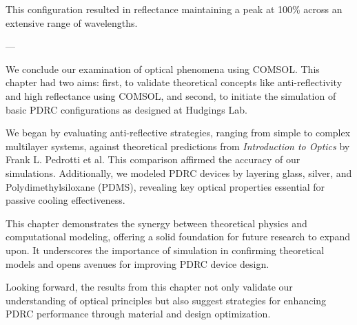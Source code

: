 This configuration resulted in reflectance maintaining a peak at 100\% across an extensive range of wavelengths.


---


We conclude our examination of optical phenomena using COMSOL. This chapter had two aims: first, to validate theoretical concepts like anti-reflectivity and high reflectance using COMSOL, and second, to initiate the simulation of basic PDRC configurations as designed at Hudgings Lab.

We began by evaluating anti-reflective strategies, ranging from simple to complex multilayer systems, against theoretical predictions from \emph{Introduction to Optics} by Frank L. Pedrotti et al. This comparison affirmed the accuracy of our simulations. Additionally, we modeled PDRC devices by layering glass, silver, and Polydimethylsiloxane (PDMS), revealing key optical properties essential for passive cooling effectiveness.

This chapter demonstrates the synergy between theoretical physics and computational modeling, offering a solid foundation for future research to expand upon. It underscores the importance of simulation in confirming theoretical models and opens avenues for improving PDRC device design.

Looking forward, the results from this chapter not only validate our understanding of optical principles but also suggest strategies for enhancing PDRC performance through material and design optimization.